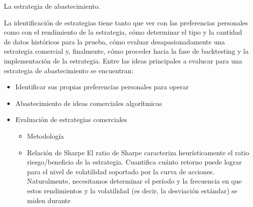 \documentclass{article}
\begin{document}
La estrategia de abastecimiento.

La identificación de estrategias tiene tanto que ver con las preferencias personales como con el rendimiento de la estrategia, cómo determinar el tipo y la cantidad de datos históricos para la prueba, cómo evaluar desapasionadamente una estrategia comercial y, finalmente, cómo proceder hacia la fase de backtesting y la implementación de la estrategia. Entre las ideas principales a evalucar para una estrategia de abastecimiento se encuentran:

\begin{itemize}
    \item  Identificar sus propias preferencias personales para operar
\item Abastecimiento de ideas comerciales algorítmicas
\item Evaluación de estrategias comerciales
\begin{itemize}
    \item  Metodología
    \item Relación de Sharpe
El ratio de Sharpe caracteriza heurísticamente el ratio riesgo/beneficio de la estrategia. Cuantifica cuánto retorno puede lograr para el nivel de volatilidad soportado por la curva de acciones. Naturalmente, necesitamos determinar el período y la frecuencia en que estos rendimientos y la volatilidad (es decir, la desviación estándar) se miden durante


\end{itemize}
\end{itemize}
\end{document}

